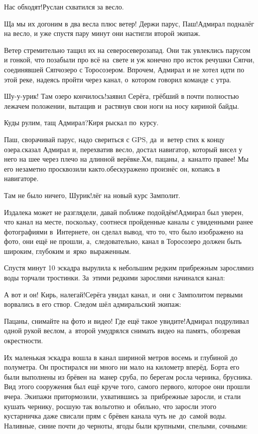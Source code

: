 \diagdash Нас обходят!\mdash Руслан схватился за весло.

\diagdash Ща мы их догоним в два весла плюс ветер! Держи парус, Паш!\mdash Адмирал подналёг на весло, и уже спустя пару минут они настигли второй экипаж.

Ветер стремительно тащил их на северо\sdash северо\sdash запад. Они так увлеклись парусом и гонкой, что позабыли про всё на~свете и уж конечно про исток речушки Сяпчи, соединявшей Сяпчозеро с Торосозером. Впрочем, Адмирал и не хотел идти по этой реке, надеясь пройти через канал, о~котором говорил команде с утра.

\diagdash Шу-у-урик! Там озеро кончилось!\mdash заявил Серёга, грёбший в почти полностью лежачем положении, вытащив и~растянув свои ноги на носу кириной байды.

\diagdash Куды рулим, тащ Адмирал?\mdash Киря рыскал по~курсу.

\diagdash Паш, сворачивай парус, надо свериться с GPS, да~и~ветер стих к концу озера.\mdash сказал Адмирал и, перехватив весло, достал навигатор, который висел у него на шее через плечо на длинной верёвке.\mdash Хм, пацаны, а~канал\sdash то правее! Мы его незаметно просквозили как\sdash то.\mdash обескуражено произнёс он, копаясь в навигаторе.

\diagdash Там не было ничего, Шурик!\mdash лёг на новый курс Замполит.

\diagdash Издалека может не разглядели, давай поближе подойдём!\mdash Адмирал был уверен, что канал на месте, поскольку, соотнеся пройденные каналы с увиденными ранее фотографиями в~Интернете, он сделал вывод, что то, что было изображено на фото, они ещё не прошли, а,~следовательно, канал в Торосозеро должен быть широким, глубоким и~ярко~выраженным. 

Спустя минут 10 эскадра вырулила к небольшим редким прибрежным зарослям\mdash из воды торчали тростинки. За~этими редкими зарослями начинался канал:

\diagdash А вот и он! Кирь, налегай!\mdash Серёга увидал канал, и~они с Замполитом первыми ворвались в его створ. Следом шёл адмиральский экипаж:

\diagdash Пацаны, снимайте на фото и видео! Где ещё такое увидите!\mdash Адмирал подруливал одной рукой веслом, а~второй умудрялся снимать видео на память, обозревая окрестности. 

Их маленькая эскадра вошла в канал шириной метров восемь и глубиной до полуметра. Он простирался ни много ни мало на километр вперёд. Борта его были выполнены из брёвен на~манер сруба, по берегам росла черника, брусника. Вид этого сооружения был ещё круче того, самого первого, которое они прошли вчера. Экипажи притормозили, ухватившись за~прибрежные заросли, и стали кушать чернику, росшую так вольготно и~обильно, что заросли этого кустарничка даже свисали прям с брёвен канала чуть не~до~самой воды. Наливные, синие почти до черноты, ягоды были крупными, спелыми, сочными:

